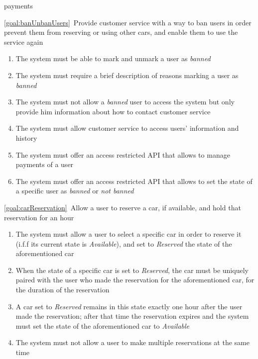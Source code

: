 \begin{description}
\begin{enumerate}[resume*]
  				payments
  			\end{enumerate}
  		\item \ref{goal:banUnbanUsers}\ Provide customer service with a way to ban users in order
  		prevent them from reserving or using other cars, and enable them to use the service again
  			\begin{enumerate}[resume*]
  				\item The system must be able to mark and unmark a user as \emph{banned} 
  				\item The system must require a brief description of reasons marking a user as
  				\emph{banned}
  				\item The system must not allow a \emph{banned} user to access the system but only
  				provide him information about how to contact customer service 
  				\item The system must allow customer service to access users' information and
  				history \todo{?}
  				\item The system must offer an access restricted API that allows to manage payments
  				of a user \todo{?}
   				\item The system must offer an access restricted API that allows to set the state of a
   				specific user as \emph{banned} or \emph{not banned}
   			\end{enumerate}
 	  	\item \ref{goal:carReservation}\ Allow a user to reserve a car, if available, and hold that
 	  	reservation for an hour
 	  		\begin{enumerate}[resume*]
 	  			\item The system must allow a user to select a specific car in order to reserve it 
 	  			(i.f.f its current state is \emph{Available}), and set to \emph{Reserved} the state of
 	  			the aforementioned car
 	  			\item When the state of a specific car is set to \emph{Reserved}, the car must be
 	  			uniquely paired with the user who made the reservation for the aforementioned car, for
 	  			the duration of the reservation
 	  			\item A car set to \emph{Reserved} remains in this state exactly one hour after the user
 	  			made the reservation; after that time the reservation expires and the system
 	  			must set the state of the aforementioned car to \emph{Available}
 	  			\item The system must not allow a user to make multiple reservations at the same time
   			\end{enumerate}

\end{description}
